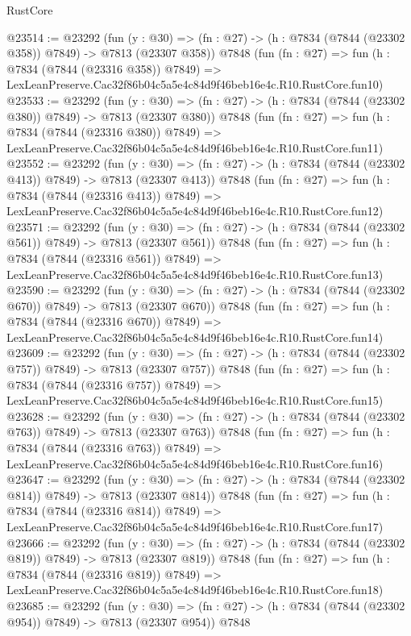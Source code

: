 \begin{lexlean}{RustCore}
\begin{coremodule}
@23514 := @23292
    (fun (y : @30) => (fn : @27) -> (h : @7834 (@7844 (@23302 @358)) @7849) -> @7813 (@23307 @358))
    @7848
    (fun (fn : @27) =>
    fun (h : @7834 (@7844 (@23316 @358)) @7849) =>
    LexLeanPreserve.Cac32f86b04c5a5e4c84d9f46beb16e4c.R10.RustCore.fun10)
@23533 := @23292
    (fun (y : @30) => (fn : @27) -> (h : @7834 (@7844 (@23302 @380)) @7849) -> @7813 (@23307 @380))
    @7848
    (fun (fn : @27) =>
    fun (h : @7834 (@7844 (@23316 @380)) @7849) =>
    LexLeanPreserve.Cac32f86b04c5a5e4c84d9f46beb16e4c.R10.RustCore.fun11)
@23552 := @23292
    (fun (y : @30) => (fn : @27) -> (h : @7834 (@7844 (@23302 @413)) @7849) -> @7813 (@23307 @413))
    @7848
    (fun (fn : @27) =>
    fun (h : @7834 (@7844 (@23316 @413)) @7849) =>
    LexLeanPreserve.Cac32f86b04c5a5e4c84d9f46beb16e4c.R10.RustCore.fun12)
@23571 := @23292
    (fun (y : @30) => (fn : @27) -> (h : @7834 (@7844 (@23302 @561)) @7849) -> @7813 (@23307 @561))
    @7848
    (fun (fn : @27) =>
    fun (h : @7834 (@7844 (@23316 @561)) @7849) =>
    LexLeanPreserve.Cac32f86b04c5a5e4c84d9f46beb16e4c.R10.RustCore.fun13)
@23590 := @23292
    (fun (y : @30) => (fn : @27) -> (h : @7834 (@7844 (@23302 @670)) @7849) -> @7813 (@23307 @670))
    @7848
    (fun (fn : @27) =>
    fun (h : @7834 (@7844 (@23316 @670)) @7849) =>
    LexLeanPreserve.Cac32f86b04c5a5e4c84d9f46beb16e4c.R10.RustCore.fun14)
@23609 := @23292
    (fun (y : @30) => (fn : @27) -> (h : @7834 (@7844 (@23302 @757)) @7849) -> @7813 (@23307 @757))
    @7848
    (fun (fn : @27) =>
    fun (h : @7834 (@7844 (@23316 @757)) @7849) =>
    LexLeanPreserve.Cac32f86b04c5a5e4c84d9f46beb16e4c.R10.RustCore.fun15)
@23628 := @23292
    (fun (y : @30) => (fn : @27) -> (h : @7834 (@7844 (@23302 @763)) @7849) -> @7813 (@23307 @763))
    @7848
    (fun (fn : @27) =>
    fun (h : @7834 (@7844 (@23316 @763)) @7849) =>
    LexLeanPreserve.Cac32f86b04c5a5e4c84d9f46beb16e4c.R10.RustCore.fun16)
@23647 := @23292
    (fun (y : @30) => (fn : @27) -> (h : @7834 (@7844 (@23302 @814)) @7849) -> @7813 (@23307 @814))
    @7848
    (fun (fn : @27) =>
    fun (h : @7834 (@7844 (@23316 @814)) @7849) =>
    LexLeanPreserve.Cac32f86b04c5a5e4c84d9f46beb16e4c.R10.RustCore.fun17)
@23666 := @23292
    (fun (y : @30) => (fn : @27) -> (h : @7834 (@7844 (@23302 @819)) @7849) -> @7813 (@23307 @819))
    @7848
    (fun (fn : @27) =>
    fun (h : @7834 (@7844 (@23316 @819)) @7849) =>
    LexLeanPreserve.Cac32f86b04c5a5e4c84d9f46beb16e4c.R10.RustCore.fun18)
@23685 := @23292
    (fun (y : @30) => (fn : @27) -> (h : @7834 (@7844 (@23302 @954)) @7849) -> @7813 (@23307 @954))
    @7848

\end{coremodule}
\end{lexlean}
